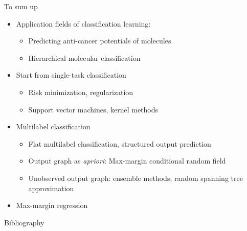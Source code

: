 \documentclass[first=dgreen,second=purple,logo=yellowexc]{aaltoslides}
\begin{document}
{\begin{frame}{To sum up}
	\begin{itemize}
		\item Application fields of classification learning:
		\begin{itemize}
			\footnotesize
			\item Predicting anti-cancer potentials of molecules
			\item Hierarchical molecular classification
		\end{itemize}
		\item Start from single-task classification
		\begin{itemize}
			\footnotesize
			\item Risk minimization, regularization
			\item Support vector machines, kernel methods
		\end{itemize}
		\item Multilabel classification
		\begin{itemize}
			\footnotesize
			\item Flat multilabel classification, structured output prediction
			\item Output graph as \textit{apriori}: Max-margin conditional random field
			\item Unobserved output graph: ensemble methods, random spanning tree approximation
		\end{itemize}
		\item Max-margin regression
	\end{itemize}
\end{frame}
\begin{frame}[allowframebreaks]{Bibliography}
%

 
\end{frame}

}
\end{document}
